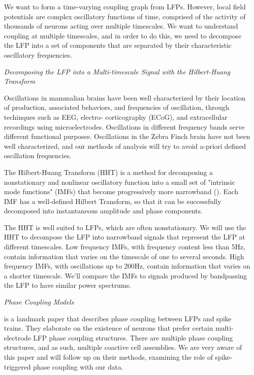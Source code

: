 \documentclass[12pt,article,oneside]{memoir}
\begin{document}
We want to form a time-varying coupling graph from LFPs. However,
local field potentials are complex oscillatory functions of time, comprised of the activity
of thousands of neurons acting over multiple timescales. We want to understand coupling at
multiple timescales, and in order to do this, we need to decompose the LFP into a set
of components that are separated by their characteristic oscillatory frequencies.

\bigskip

\noindent \textit{Decomposing the LFP into a Multi-timescale Signal with the Hilbert-Huang Transform}

Oscillations in mammalian brains have been well characterized by their location of production,
associated behaviors, and frequencies of oscillation, through techinques such as EEG, electro-
corticography (ECoG), and extracellular recordings using microelectrodes. Oscillations in different
frequency bands serve different functional purposes. Oscillations in the Zebra Finch brain have
not been well characterized, and our methods of analysis will try to avoid a-priori defined
oscillation frequencies.

The Hilbert-Huang Transform (HHT) is a method for decomposing a nonstationary and nonlinear
oscillatory function into a small set of "intrinsic mode functions" (IMFs) that become
progressively more narrowband (\cite{Huang1998}). Each IMF has a well-defined Hilbert Transform, so that it can
be successfully decomposed into instantaneous amplitude and phase components.

The HHT is well suited to LFPs, which are often nonstationary. We will use the HHT to
decompose the LFP into narrowband signals that represent the LFP at different timescales. Low
frequency IMFs, with frequency content less than 5Hz, contain information that varies on the
timescale of one to several seconds. High frequency IMFs, with oscillations up to 200Hz, contain
information that varies on a shorter timescale. We'll compare the IMFs to signals produced by
bandpassing the LFP to have similar power spectrums.

\bigskip

\noindent \textit{Phase Coupling Models}

\cite{Canolty2010} is a landmark paper that describes phase coupling between LFPs and spike
trains. They elaborate on the existence of neurons that prefer certain multi-electrode LFP
phase coupling structures. There are multiple phase coupling structures, and as such, multiple
coactive cell assemblies. We are very aware of this paper and will follow up on their methods,
examining the role of spike-triggered phase coupling with our data.
\end{document}
